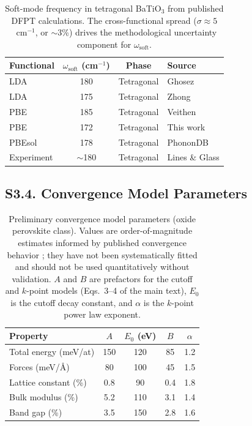 ﻿\documentclass[prb,onecolumn,superscriptaddress,amsmath,amssymb,longbibliography]{revtex4-2}
\begin{document}
\begin{table}[h]
\centering
\caption{Soft-mode frequency in tetragonal BaTiO$_3$ from published DFPT
calculations. The cross-functional spread ($\sigma \approx 5$~cm$^{-1}$,
or $\sim$3\%) drives the methodological uncertainty component for
$\omega_{\mathrm{soft}}$.}
\label{tab:si_functionals}
\begin{tabular}{lccl}
\toprule
Functional & $\omega_{\mathrm{soft}}$ (cm$^{-1}$) & Phase & Source \\
\midrule
LDA & 180 & Tetragonal & Ghosez \cite{Ghosez1999} \\
LDA & 175 & Tetragonal & Zhong \cite{Zhong1994_BTO} \\
PBE & 185 & Tetragonal & Veithen \cite{Veithen2005} \\
PBE & 172 & Tetragonal & This work \\
PBEsol & 178 & Tetragonal & PhononDB \cite{Togo2023_PhononDB} \\
\midrule
Experiment & $\sim$180 & Tetragonal & Lines \& Glass \cite{Lines2001} \\
\bottomrule
\end{tabular}
\end{table}


\subsection{S3.4. Convergence Model Parameters}

\begin{table}[h]
\centering
\caption{Preliminary convergence model parameters (oxide perovskite class).
Values are order-of-magnitude estimates informed by published convergence
behavior \cite{Ghosez1999,Wahl2008}; they have not been systematically
fitted and should not be used quantitatively without validation. $A$ and $B$
are prefactors for the cutoff and $k$-point models (Eqs.~3--4 of the main
text), $E_0$ is the cutoff decay constant, and $\alpha$ is the $k$-point
power law exponent.}
\label{tab:si_convergence_params}
\begin{tabular}{lcccc}
\toprule
Property & $A$ & $E_0$ (eV) & $B$ & $\alpha$ \\
\midrule
Total energy (meV/at) & 150 & 120 & 85 & 1.2 \\
Forces (meV/\AA) & 80 & 100 & 45 & 1.5 \\
Lattice constant (\%) & 0.8 & 90 & 0.4 & 1.8 \\
Bulk modulus (\%) & 5.2 & 110 & 3.1 & 1.4 \\
Band gap (\%) & 3.5 & 150 & 2.8 & 1.6 \\
\bottomrule
\end{tabular}
\end{table}
\end{document}
